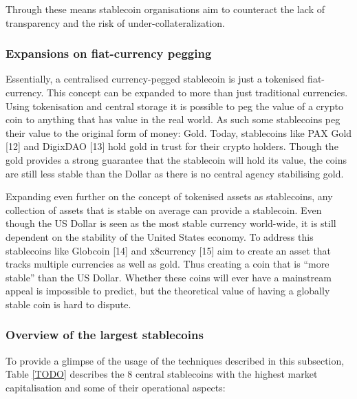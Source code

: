 \documentclass[english,]{IEEEtran}
\begin{document}
Through these means stablecoin organisations aim to counteract the lack
of transparency and the risk of under-collateralization.

\subsubsection{Expansions on fiat-currency
pegging}\label{expansions-on-fiat-currency-pegging}

Essentially, a centralised currency-pegged stablecoin is just a
tokenised fiat-currency. This concept can be expanded to more than just
traditional currencies. Using tokenisation and central storage it is
possible to peg the value of a crypto coin to anything that has value in
the real world. As such some stablecoins peg their value to the original
form of money: Gold. Today, stablecoins like PAX Gold {[}12{]} and
DigixDAO {[}13{]} hold gold in trust for their crypto holders. Though
the gold provides a strong guarantee that the stablecoin will hold its
value, the coins are still less stable than the Dollar as there is no
central agency stabilising gold.

Expanding even further on the concept of tokenised assets as
stablecoins, any collection of assets that is stable on average can
provide a stablecoin. Even though the US Dollar is seen as the most
stable currency world-wide, it is still dependent on the stability of
the United States economy. To address this stablecoins like Globcoin
{[}14{]} and x8currency {[}15{]} aim to create an asset that tracks
multiple currencies as well as gold. Thus creating a coin that is ``more
stable'' than the US Dollar. Whether these coins will ever have a
mainstream appeal is impossible to predict, but the theoretical value of
having a globally stable coin is hard to dispute.

\subsubsection{Overview of the largest
stablecoins}\label{overview-of-the-largest-stablecoins}

To provide a glimpse of the usage of the techniques described in this
subsection, Table \ref{TODO} describes the 8 central stablecoins with
the highest market capitalisation and some of their operational aspects:
\end{document}

